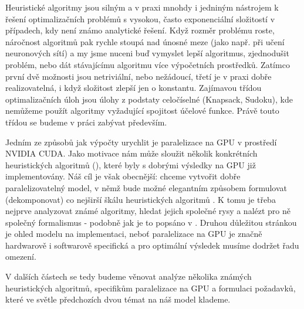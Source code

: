 

Heuristické algoritmy jsou silným a v praxi mnohdy i jedniným nástrojem k řešení optimalizačních problémů s vysokou, často exponenciální složitostí v případech, kdy není známo analytické řešení. Když rozměr problému roste, náročnost algoritmů pak rychle stoupá nad únosné meze (jako např. při učení neuronových sítí) a my jsme nuceni buď vymyslet lepší algoritmus, zjednodušit problém, nebo dát stávajícímu algoritmu více výpočetních prostředků. Zatímco první dvě možnosti jsou netriviální, nebo nežádoucí, třetí je v praxi dobře realizovatelná, i když složitost zlepší jen o konstantu. Zajímavou třídou optimalizačních úloh  jsou úlohy z podstaty celočíselné (Knapsack, Sudoku), kde nemůžeme použít algoritmy vyžadující spojitost účelové funkce. Právě touto třídou se budeme v práci zabývat především.


Jedním ze způsobů jak výpočty urychlit je paralelizace na GPU v prostředí NVIDIA CUDA. Jako motivace nám může sloužit několik konkrétních heuristických algoritmů (), které byly s dobrými výsledky na GPU již implementovány. Náš cíl je však obecnější: chceme vytvořit dobře paralelizovatelný model, v němž bude možné elegantním způsobem formulovat (dekomponovat) co nejširší škálu heuristických algoritmů . K tomu je třeba nejprve analyzovat známé algoritmy, hledat jejich společné rysy a nalézt pro ně společný formalismus - podobně jak je to popsáno v \cite{GO ebook}. Druhou důležitou stránkou je ohled modelu na implementaci, neboť paralelizace na GPU je značně hardwarově i softwarově specifická a pro optimální výsledek musíme dodržet řadu omezení.


V dalších částech se tedy budeme věnovat analýze několika známých heuristických algoritmů, specifikům paralelizace na GPU a formulaci požadavků, které ve světle předchozích dvou témat na náš model klademe. 